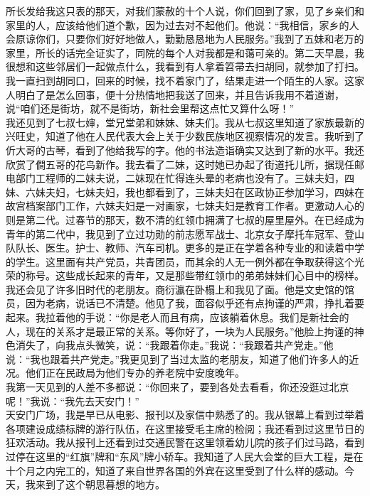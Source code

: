 所长发给我这只表的那天，对我们蒙赦的十个人说，你们回到了家，见了乡亲们和家里的人，应该给他们道个歉，因为过去对不起他们。他说：“我相信，家乡的人会原谅你们，只要你们好好地做人，勤勤恳恳地为人民服务。”我到了五妹和老万的家里，所长的话完全证实了，同院的每个人对我都是和蔼可亲的。第二天早晨，我很想和这些邻居们一起做点什么，我看到有人拿着笤帚去扫胡同，就参加了打扫。我一直扫到胡同口，回来的时候，找不着家门了，结果走进一个陌生的人家。这家人明白了是怎么回事，便十分热情地把我送了回来，并且告诉我用不着道谢，说“咱们还是街坊，就不是街坊，新社会里帮这点忙又算什么呀！”\\

我还见到了七叔七婶，堂兄堂弟和妹妹、妹夫们。我从七叔这里知道了家族最新的兴旺史，知道了他在人民代表大会上关于少数民族地区视察情况的发言。我听到了伒大哥的古琴，看到了他给我写的字。他的书法造诣确实又达到了新的水平。我还欣赏了僴五哥的花鸟新作。我去看了二妹，这时她已办起了街道托儿所，据现任邮电部门工程师的二妹夫说，二妹现在忙得连头晕的老病也没有了。三妹夫妇，四妹、六妹夫妇，七妹夫妇，我也都看到了，三妹夫妇在区政协正参加学习，四妹在故宫档案部门工作，六妹夫妇是一对画家，七妹夫妇是教育工作者。更激动人心的则是第二代。过春节的那天，数不清的红领巾拥满了七叔的屋里屋外。在已经成为青年的第二代中，我见到了立过功勋的前志愿军战士、北京女子摩托车冠军、登山队队长、医生。护士、教师、汽车司机。更多的是正在学着各种专业的和读着中学的学生。这里面有共产党员，共青团员，而其余的人无一例外都在争取获得这个光荣的称号。这些成长起来的青年，又是那些带红领巾的弟弟妹妹们心目中的榜样。\\

我还会见了许多旧时代的老朋友。商衍瀛在卧榻上和我见了面。他是文史馆的馆员，因为老病，说话已不清楚。他见了我，面容似乎还有点拘谨的严肃，挣扎着要起来。我拉着他的手说：“你是老人而且有病，应该躺着休息。我们是新社会的人，现在的关系才是最正常的关系。等你好了，一块为人民服务。”他脸上拘谨的神色消失了，向我点头微笑，说：“我跟着你走。”我说：“我跟着共产党走。”他说：“我也跟着共产党走。”我更见到了当过太监的老朋友，知道了他们许多人的近况。他们正在民政局为他们专办的养老院中安度晚年。\\

我第一天见到的人差不多都说：“你回来了，要到各处去看看，你还没逛过北京呢！”我说：“我先去天安门！”\\

天安门广场，我是早已从电影、报刊以及家信中熟悉了的。我从银幕上看到过举着各项建设成绩标牌的游行队伍，在这里接受毛主席的检阅；我还看到过这里节日的狂欢活动。我从报刊上还看到过交通民警在这里领着幼儿院的孩子们过马路，看到过停在这里的“红旗”牌和“东风”牌小轿车。我知道了人民大会堂的巨大工程，是在十个月之内完工的，知道了来自世界各国的外宾在这里受到了什么样的感动。今天，我来到了这个朝思暮想的地方。\\

